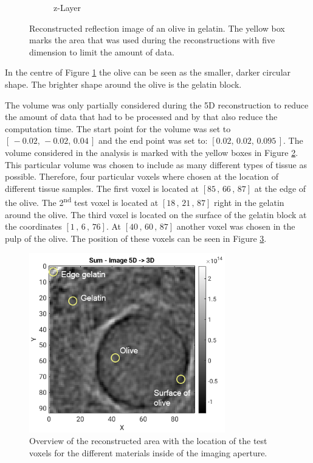 \begin{figure}[H]
\begin{subfigure}[b]{0.55\textwidth}
         \caption{z-Layer}
         \label{fig:res:reflec_image_olive_xyz_z}
     \end{subfigure}
        \caption{Reconstructed reflection image of an olive in gelatin. The yellow box marks the area that was used during the reconstructions with five dimension to limit the amount of data.}
        \label{fig:res:reflec_image_olive_xyz}
\end{figure}


In the centre of Figure \ref{fig:res:reflec_image_olive_xyz_z} the olive can be seen as the smaller, darker circular shape. The brighter shape around the olive is the gelatin block. 

\bigskip


The volume was only partially considered during the 5D reconstruction to reduce the amount of data that had to be processed and by that also reduce the computation time. The start point for the volume was set to $[\, -0.02,\, -0.02,\, 0.04\, ]$ and the end point was set to: $[ 0.02,\, 0.02,\, 0.095\, ]$. The volume considered in the analysis is marked with the yellow boxes in Figure \ref{fig:res:reflec_image_olive_xyz}. This particular volume was chosen to include as many different types of tissue as possible. Therefore, four particular voxels where chosen at the location of different tissue samples. The first voxel is located at $[85\, , \, 66\, , \, 87]$ at the edge of the olive. The 2\textsuperscript{nd} test voxel is located at $[18\, , \, 21\, , \, 87]$ right in the gelatin around the olive. The third voxel is located on the surface of the gelatin block at the coordinates $[1\, , \, 6\, , \, 76]$. At $[40\, , \, 60\, , \, 87]$ another voxel was chosen in the pulp of the olive. The position of these voxels can be seen in Figure \ref{fig:different_tisue_types}.  
      
      
      
\begin{figure}[H]
    \centering
    \includegraphics[width=0.76\textwidth]{Graphics/Results/Variance_Image/stone_skin_pulp_location.png}
    \caption{Overview of the reconstructed area with the location of the test voxels for the different materials inside of the imaging aperture.}
    \label{fig:different_tisue_types}
\end{figure}
    


